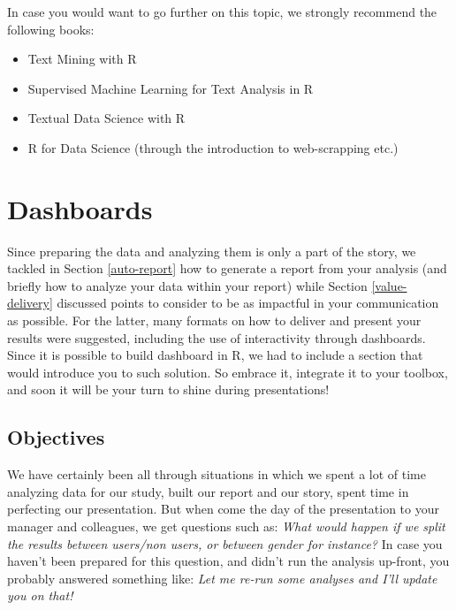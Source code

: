 \documentclass[
]{krantz}
\providecommand{\tightlist}{%
  \setlength{\itemsep}{0pt}\setlength{\parskip}{0pt}}
\renewenvironment{quote}{\begin{VF}}{\end{VF}}
\begin{document}
In case you would want to go further on this topic, we strongly recommend the following books:

\begin{itemize}
\tightlist
\item
  Text Mining with R
\item
  Supervised Machine Learning for Text Analysis in R
\item
  Textual Data Science with R
\item
  R for Data Science (through the introduction to web-scrapping etc.)
\end{itemize}

\hypertarget{dashboards}{%
\chapter{Dashboards}\label{dashboards}}

\begin{quote}
Since preparing the data and analyzing them is only a part of the story, we tackled in Section \ref{auto-report} how to generate a report from your analysis (and briefly how to analyze your data within your report) while Section \ref{value-delivery} discussed points to consider to be as impactful in your communication as possible. For the latter, many formats on how to deliver and present your results were suggested, including the use of interactivity through dashboards. Since it is possible to build dashboard in R, we had to include a section that would introduce you to such solution. So embrace it, integrate it to your toolbox, and soon it will be your turn to shine during presentations!
\end{quote}

\hypertarget{objectives}{%
\section{Objectives}\label{objectives}}

We have certainly been all through situations in which we spent a lot of time analyzing data for our study, built our report and our story, spent time in perfecting our presentation. But when come the day of the presentation to your manager and colleagues, we get questions such as: \emph{What would happen if we split the results between users/non users, or between gender for instance?} In case you haven't been prepared for this question, and didn't run the analysis up-front, you probably answered something like: \emph{Let me re-run some analyses and I'll update you on that!}
\end{document}
